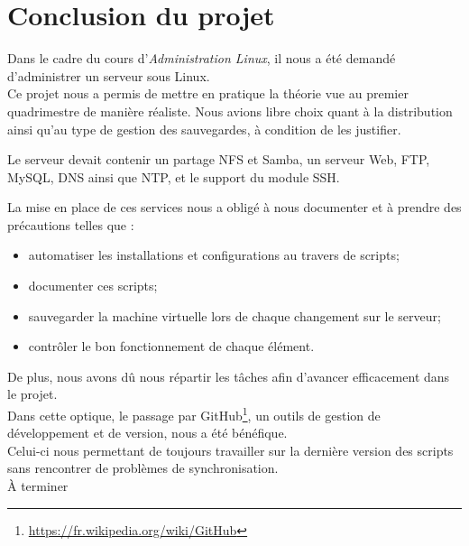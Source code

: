 \section{Conclusion du projet}
\label{sec:conclusion-projet}

Dans le cadre du cours d'\emph{Administration Linux}, il nous a été demandé
d'administrer un serveur sous Linux. \\

Ce projet nous a permis de mettre en pratique la théorie vue au premier
quadrimestre de manière réaliste. Nous avions libre choix quant à la distribution
ainsi qu'au type de gestion des sauvegardes, à condition de les justifier.

Le serveur devait contenir un partage NFS et Samba, un serveur Web, FTP, MySQL,
DNS ainsi que NTP, et le support du module SSH.

La mise en place de ces services nous a obligé à nous documenter et à prendre
des précautions telles que :
\begin{itemize}
\item automatiser les installations et configurations au travers de scripts;
\item documenter ces scripts;
\item sauvegarder la machine virtuelle lors de chaque changement sur le serveur;
\item contrôler le bon fonctionnement de chaque élément. \\
\end{itemize}

De plus, nous avons dû nous répartir les tâches afin d'avancer efficacement
dans le projet. \\
Dans cette optique, le passage par
GitHub\footnote{\url{https://fr.wikipedia.org/wiki/GitHub}}, un outils de
gestion de développement et de version, nous a été bénéfique. \\
Celui-ci nous permettant de toujours travailler sur la dernière version des
scripts sans rencontrer de problèmes de synchronisation. \\

À terminer


